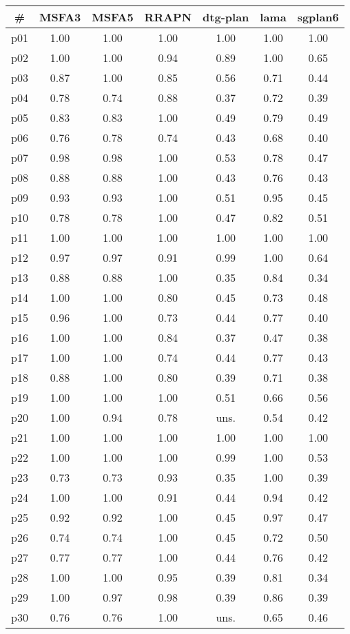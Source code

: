 \begin{tabular}{c||c|c|c|c|c|c}
\textbf{\#} & \textbf{MSFA3} & \textbf{MSFA5} & \textbf{RRAPN} & \textbf{dtg-plan} & \textbf{lama} & \textbf{sgplan6}\\
\hline
\hline
p01 & 1.00 & 1.00 & 1.00 & 1.00 & 1.00 & 1.00\\
p02 & 1.00 & 1.00 & 0.94 & 0.89 & 1.00 & 0.65\\
p03 & 0.87 & 1.00 & 0.85 & 0.56 & 0.71 & 0.44\\
p04 & 0.78 & 0.74 & 0.88 & 0.37 & 0.72 & 0.39\\
p05 & 0.83 & 0.83 & 1.00 & 0.49 & 0.79 & 0.49\\
p06 & 0.76 & 0.78 & 0.74 & 0.43 & 0.68 & 0.40\\
p07 & 0.98 & 0.98 & 1.00 & 0.53 & 0.78 & 0.47\\
p08 & 0.88 & 0.88 & 1.00 & 0.43 & 0.76 & 0.43\\
p09 & 0.93 & 0.93 & 1.00 & 0.51 & 0.95 & 0.45\\
p10 & 0.78 & 0.78 & 1.00 & 0.47 & 0.82 & 0.51\\
p11 & 1.00 & 1.00 & 1.00 & 1.00 & 1.00 & 1.00\\
p12 & 0.97 & 0.97 & 0.91 & 0.99 & 1.00 & 0.64\\
p13 & 0.88 & 0.88 & 1.00 & 0.35 & 0.84 & 0.34\\
p14 & 1.00 & 1.00 & 0.80 & 0.45 & 0.73 & 0.48\\
p15 & 0.96 & 1.00 & 0.73 & 0.44 & 0.77 & 0.40\\
p16 & 1.00 & 1.00 & 0.84 & 0.37 & 0.47 & 0.38\\
p17 & 1.00 & 1.00 & 0.74 & 0.44 & 0.77 & 0.43\\
p18 & 0.88 & 1.00 & 0.80 & 0.39 & 0.71 & 0.38\\
p19 & 1.00 & 1.00 & 1.00 & 0.51 & 0.66 & 0.56\\
p20 & 1.00 & 0.94 & 0.78 & uns. & 0.54 & 0.42\\
p21 & 1.00 & 1.00 & 1.00 & 1.00 & 1.00 & 1.00\\
p22 & 1.00 & 1.00 & 1.00 & 0.99 & 1.00 & 0.53\\
p23 & 0.73 & 0.73 & 0.93 & 0.35 & 1.00 & 0.39\\
p24 & 1.00 & 1.00 & 0.91 & 0.44 & 0.94 & 0.42\\
p25 & 0.92 & 0.92 & 1.00 & 0.45 & 0.97 & 0.47\\
p26 & 0.74 & 0.74 & 1.00 & 0.45 & 0.72 & 0.50\\
p27 & 0.77 & 0.77 & 1.00 & 0.44 & 0.76 & 0.42\\
p28 & 1.00 & 1.00 & 0.95 & 0.39 & 0.81 & 0.34\\
p29 & 1.00 & 0.97 & 0.98 & 0.39 & 0.86 & 0.39\\
p30 & 0.76 & 0.76 & 1.00 & uns. & 0.65 & 0.46\\
\end{tabular}

